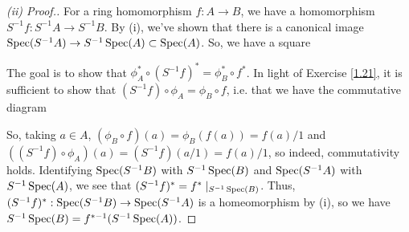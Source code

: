 \begin{proof}[(ii) Proof.]
For a ring homomorphism $f : A \to B$, we have a homomorphism $S^{-1}f : S^{-1}A \to S^{-1}B$. By (i), we've shown that there is a canonical image $\operatorname{Spec}(S^{-1}A) \to S^{-1}\operatorname{Spec}(A) \subset \operatorname{Spec}(A)$. So, we 
have a square
\begin{center}
\end{center}
The goal is to show that $\phi_A^* \circ (S^{-1}f)^* = \phi_B^* \circ f^*$. In light of Exercise \ref{1.21}, it is sufficient to show that $(S^{-1}f) \circ \phi_A = \phi_B \circ f$, i.e. that we have
the commutative diagram
\begin{center}
\end{center}
So, taking $a \in A$, $(\phi_B \circ f)(a) = \phi_B(f(a)) = f(a)/1$ and $((S^{-1}f)\circ \phi_A)(a) = (S^{-1}f)(a/1) = f(a)/1$, so indeed, commutativity holds. Identifying $\operatorname{Spec}(S^{-1}B)$ 
with $S^{-1}\operatorname{Spec}(B)$ and $\operatorname{Spec}(S^{-1}A)$ with $S^{-1}\operatorname{Spec}(A)$, we see that $(S^{-1}f)^* = f^*\mid_{S^{-1}\operatorname{Spec}(B)}$. Thus, $(S^{-1}f)^* : \operatorname{Spec}(S^{-1}B) \to \operatorname{Spec}(S^{-1}A)$
is a homeomorphism by (i), so we have $S^{-1}\operatorname{Spec}(B) = f^{*-1}(S^{-1}\operatorname{Spec}(A))$.
\end{proof}


